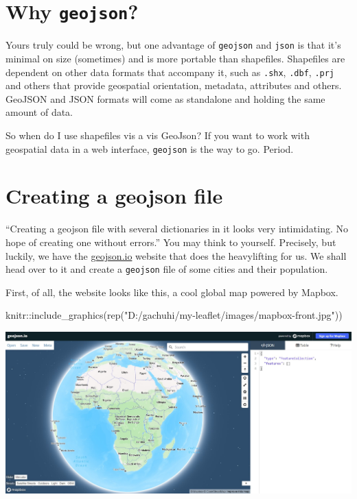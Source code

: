 \documentclass[
]{book}
\newenvironment{Shaded}{\begin{snugshade}}{\end{snugshade}}
\newcommand{\FunctionTok}[1]{\textcolor[rgb]{0.00,0.00,0.00}{#1}}
\newcommand{\NormalTok}[1]{#1}
\newcommand{\SpecialCharTok}[1]{\textcolor[rgb]{0.00,0.00,0.00}{#1}}
\newcommand{\StringTok}[1]{\textcolor[rgb]{0.31,0.60,0.02}{#1}}
\begin{document}
\hypertarget{why-geojson}{%
\section{\texorpdfstring{Why \texttt{geojson}?}{Why geojson?}}\label{why-geojson}}

Yours truly could be wrong, but one advantage of \texttt{geojson} and \texttt{json} is that it's minimal on size (sometimes) and is more portable than shapefiles. Shapefiles are dependent on other data formats that accompany it, such as \texttt{.shx}, \texttt{.dbf}, \texttt{.prj} and others that provide geospatial orientation, metadata, attributes and others. GeoJSON and JSON formats will come as standalone and holding the same amount of data.

So when do I use shapefiles vis a vis GeoJson? If you want to work with geospatial data in a web interface, \texttt{geojson} is the way to go. Period.

\hypertarget{creating-a-geojson-file}{%
\section{Creating a geojson file}\label{creating-a-geojson-file}}

``Creating a geojson file with several dictionaries in it looks very intimidating. No hope of creating one without errors.'' You may think to yourself. Precisely, but luckily, we have the \href{https://geojson.io/\#map=2/0/20}{geojson.io} website that does the heavylifting for us. We shall head over to it and create a \texttt{geojson} file of some cities and their population.

First, of all, the website looks like this, a cool global map powered by Mapbox.

\begin{Shaded}
\begin{Highlighting}[]
\NormalTok{knitr}\SpecialCharTok{::}\FunctionTok{include\_graphics}\NormalTok{(}\FunctionTok{rep}\NormalTok{(}\StringTok{"D:/gachuhi/my{-}leaflet/images/mapbox{-}front.jpg"}\NormalTok{))}
\end{Highlighting}
\end{Shaded}

\includegraphics[width=26.61in]{../images/mapbox-front}
\end{document}
